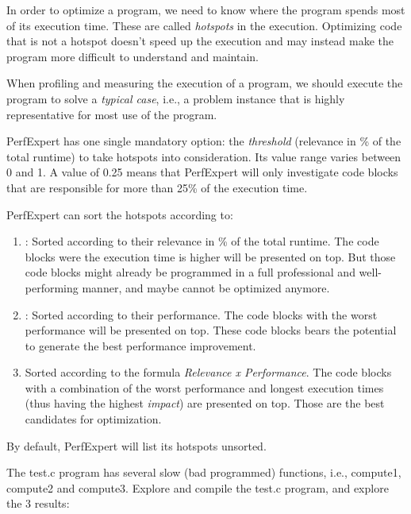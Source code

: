 In order to optimize a program, we need to know where the program spends most of its execution time. These are called \emph{hotspots} in the execution. Optimizing code that is not a hotspot doesn't speed up the execution and may instead make the program more difficult to understand and maintain.

When profiling and measuring the execution of a program, we should execute the program to solve a \emph{typical case}, i.e., a problem instance that is highly representative for most use of the program.

PerfExpert has one single mandatory option: the \emph{threshold} (relevance in \% of the total runtime) to take hotspots into consideration. Its value range varies between 0 and 1. A value of 0.25 means that PerfExpert will only investigate code blocks that are responsible for more than 25\% of the execution time.

PerfExpert can sort the hotspots according to:

\begin{enumerate}
  \item  {}: Sorted according to their relevance in \% of the total runtime. The code blocks were the execution time is higher will be presented on top. But those code blocks might already be programmed in a full professional and well-performing manner, and maybe cannot be optimized anymore.
  \item  {}: Sorted according to their performance. The code blocks with the worst performance will be presented on top. These code blocks bears the potential to generate the best performance improvement.
  \item  {} Sorted according to the formula \emph{Relevance x Performance}. The code blocks with a combination of the worst performance and longest execution times (thus having the highest \emph{impact}) are presented on top. Those are the best candidates for optimization.
\end{enumerate}

By default, PerfExpert will list its hotspots unsorted.

The test.c program has several slow (bad programmed) functions, i.e., compute1, compute2 and compute3. Explore and compile the test.c program, and explore the 3 results:

\begin{prompt}
\end{prompt}

